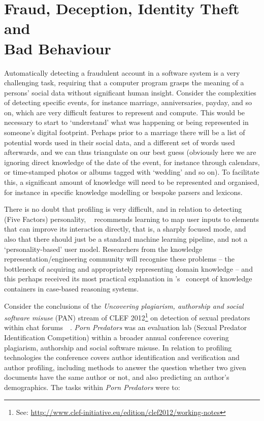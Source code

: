 \documentclass[letterpaper]{article}
\begin{document}
\section{Fraud, Deception, Identity Theft and\\Bad Behaviour}

Automatically detecting a fraudulent account in a software system is a
very challenging task, requiring that a computer program grasps the
meaning of a persons' social data without significant human
insight. Consider the complexities of detecting specific events, for
instance marriage, anniversaries, payday, and so on, which are very
difficult features to represent and compute. This would be necessary
to start to `understand' what was happening or being represented in
someone's digital footprint. Perhaps prior to a marriage there will be
a list of potential words used in their social data, and a different
set of words used afterwards, and we can thus triangulate on our best
guess (obviously here we are ignoring direct knowledge of the date of
the event, for instance through calendars, or time-stamped photos or
albums tagged with `wedding' and so on). To facilitate this, a
significant amount of knowledge will need to be represented and
organised, for instance in specific knowledge modelling or bespoke
parsers and lexicons.

There is no doubt that profiling is very difficult, and in relation to
detecting (Five Factors) personality,
\citeauthor{mairesse:2013}~ recommends
learning to map user inputs to elements that can improve its
interaction directly, that is, a sharply focused mode, and also that
there should just be a standard machine learning pipeline, and not a
`personality-based' user model. Researchers from the knowledge
representation/engineering community will recognise these problems --
the bottleneck of acquiring and appropriately representing domain
knowledge -- and this perhaps received its most practical explanation
in \citeauthor{richter:2003}'s~ concept of
knowledge containers in case-based reasoning systems.

Consider the conclusions of the {\emph{Uncovering plagiarism,
authorship and social software misuse}} (PAN) stream of CLEF
2012\footnote{See:
\url{http://www.clef-initiative.eu/edition/clef2012/working-notes}} on
detection of sexual predators within chat
forums~~\cite{inches+crestani:2012}. {\emph{Porn Predators}} was an
evaluation lab (Sexual Predator Identification Competition) within a
broader annual conference covering plagiarism, authorship and social
software misuse. In relation to profiling technologies the conference
covers author identification and verification and author profiling,
including methods to answer the question whether two given documents
have the same author or not, and also predicting an author's
demographics. The tasks within {\emph{Porn Predators}} were to:
\end{document}

